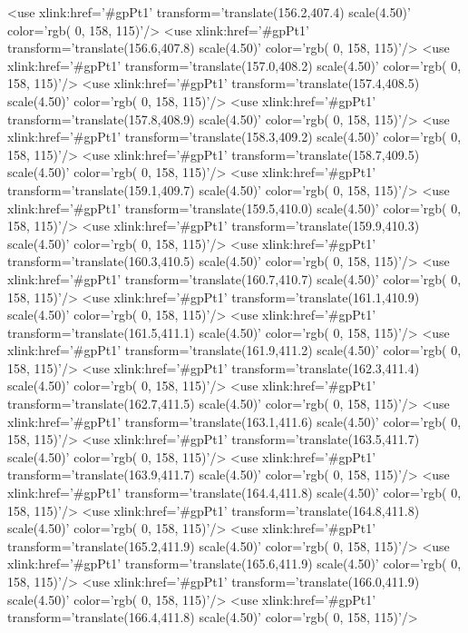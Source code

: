 	<use xlink:href='#gpPt1' transform='translate(156.2,407.4) scale(4.50)' color='rgb(  0, 158, 115)'/>
	<use xlink:href='#gpPt1' transform='translate(156.6,407.8) scale(4.50)' color='rgb(  0, 158, 115)'/>
	<use xlink:href='#gpPt1' transform='translate(157.0,408.2) scale(4.50)' color='rgb(  0, 158, 115)'/>
	<use xlink:href='#gpPt1' transform='translate(157.4,408.5) scale(4.50)' color='rgb(  0, 158, 115)'/>
	<use xlink:href='#gpPt1' transform='translate(157.8,408.9) scale(4.50)' color='rgb(  0, 158, 115)'/>
	<use xlink:href='#gpPt1' transform='translate(158.3,409.2) scale(4.50)' color='rgb(  0, 158, 115)'/>
	<use xlink:href='#gpPt1' transform='translate(158.7,409.5) scale(4.50)' color='rgb(  0, 158, 115)'/>
	<use xlink:href='#gpPt1' transform='translate(159.1,409.7) scale(4.50)' color='rgb(  0, 158, 115)'/>
	<use xlink:href='#gpPt1' transform='translate(159.5,410.0) scale(4.50)' color='rgb(  0, 158, 115)'/>
	<use xlink:href='#gpPt1' transform='translate(159.9,410.3) scale(4.50)' color='rgb(  0, 158, 115)'/>
	<use xlink:href='#gpPt1' transform='translate(160.3,410.5) scale(4.50)' color='rgb(  0, 158, 115)'/>
	<use xlink:href='#gpPt1' transform='translate(160.7,410.7) scale(4.50)' color='rgb(  0, 158, 115)'/>
	<use xlink:href='#gpPt1' transform='translate(161.1,410.9) scale(4.50)' color='rgb(  0, 158, 115)'/>
	<use xlink:href='#gpPt1' transform='translate(161.5,411.1) scale(4.50)' color='rgb(  0, 158, 115)'/>
	<use xlink:href='#gpPt1' transform='translate(161.9,411.2) scale(4.50)' color='rgb(  0, 158, 115)'/>
	<use xlink:href='#gpPt1' transform='translate(162.3,411.4) scale(4.50)' color='rgb(  0, 158, 115)'/>
	<use xlink:href='#gpPt1' transform='translate(162.7,411.5) scale(4.50)' color='rgb(  0, 158, 115)'/>
	<use xlink:href='#gpPt1' transform='translate(163.1,411.6) scale(4.50)' color='rgb(  0, 158, 115)'/>
	<use xlink:href='#gpPt1' transform='translate(163.5,411.7) scale(4.50)' color='rgb(  0, 158, 115)'/>
	<use xlink:href='#gpPt1' transform='translate(163.9,411.7) scale(4.50)' color='rgb(  0, 158, 115)'/>
	<use xlink:href='#gpPt1' transform='translate(164.4,411.8) scale(4.50)' color='rgb(  0, 158, 115)'/>
	<use xlink:href='#gpPt1' transform='translate(164.8,411.8) scale(4.50)' color='rgb(  0, 158, 115)'/>
	<use xlink:href='#gpPt1' transform='translate(165.2,411.9) scale(4.50)' color='rgb(  0, 158, 115)'/>
	<use xlink:href='#gpPt1' transform='translate(165.6,411.9) scale(4.50)' color='rgb(  0, 158, 115)'/>
	<use xlink:href='#gpPt1' transform='translate(166.0,411.9) scale(4.50)' color='rgb(  0, 158, 115)'/>
	<use xlink:href='#gpPt1' transform='translate(166.4,411.8) scale(4.50)' color='rgb(  0, 158, 115)'/>
